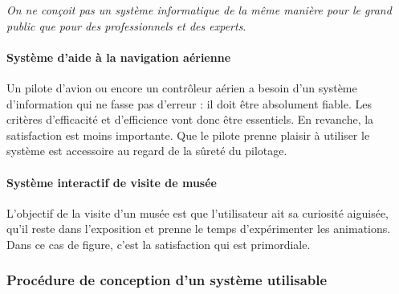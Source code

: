 \emph{On ne conçoit pas un système informatique de la même manière pour le grand public que pour des professionnels et des experts}.

\paragraph*{Système d'aide à la navigation aérienne}
Un pilote d'avion ou encore un contrôleur aérien a besoin d'un système d'information qui ne fasse pas d'erreur : il doit être absolument fiable. Les critères d'efficacité et d'efficience vont donc être essentiels. En revanche, la satisfaction est moins importante. Que le pilote prenne plaisir à utiliser le système est accessoire au regard de la sûreté du pilotage. 

\paragraph*{Système interactif de visite de musée}
L'objectif de la visite d'un musée est que l'utilisateur ait sa curiosité aiguisée, qu'il reste dans l'exposition et prenne le temps d'expérimenter les animations. Dans ce cas de figure, c'est la satisfaction qui est primordiale. 


\subsubsection[Procédure de conception]{Procédure de conception d'un système utilisable}
\label{subsub:I.3.1.3}

